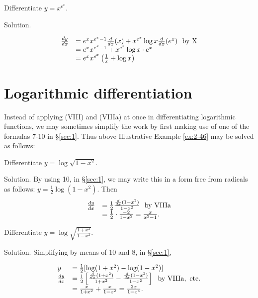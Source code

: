\begin{example}
\label{ex:5-46}
{\rm
Differentiate $y = x^{e^x}$.

Solution.

\[
\begin{array}{ll}
	\frac{dy}{dx} 
&	= e^x x^{e^x - 1} \frac{d}{dx} (x) + x^{e^x} \log x \frac{d}{dx} (e^x)  \ \ {\rm by\ X}\\
&  	= e^x x^{e^x - 1} + x^{e^x} \log x \cdot e^x\\
&  	= e^x x^{e^x} \left ( \frac{1}{x} + \log x \right ) 
\end{array}
\]
}
\end{example}

\section{Logarithmic differentiation}

Instead of applying (VIII) and (VIIIa) at once in differentiating logarithmic 
functions, we may sometimes simplify the work by first making use of one 
of the formulas 7-10 in \S \ref{sec:1}. %
Thus above Illustrative Example \ref{ex:2-46} may be solved as follows:


\begin{example}
{\rm
Differentiate $y = \log \sqrt{1 - x^2}$.

Solution. By using 10, in \S \ref{sec:1}, %
we may write this in a form free from radicals as follows:
$  	y 	= \frac{1}{2} \log (1 - x^2)$.
Then 
\[
\begin{array}{ll}
	\frac{dy}{dx} 	
&= \frac{1}{2} \frac{\frac{d}{dx} (1 - x^2)}{1 - x^2}  \ \ {\rm by\ VIIIa}\\
&  	= \frac{1}{2} \cdot \frac{-2}{1 - x^2} = \frac{x}{x^2 - 1}. 
\end{array}
\]
}
\end{example}

\begin{example}
{\rm
Differentiate $y = \log \sqrt{\frac{1 + x^2}{1 - x^2}}$.

Solution. Simplifying by means of 10 and 8, in \S \ref{sec:1}, %

\[
\begin{array}{ll}
  	y 	&= \frac{1}{2} [ \log (1 + x^2) - \log (1 - x^2) ]\\
\frac{dy}{dx} 	
&= \frac{1}{2} \left [ \frac{\frac{d}{dx} (1 + x^2)}{1 + x^2} 
- \frac{\frac{d}{dx} (1 - x^2)}{1 - x^2} \right ]   \ \ {\rm by\ VIIIa,\ etc.}\\
&  	= \frac{x}{1 + x^2} + \frac{x}{1 - x^2} = \frac{2x}{1 - x^4}. 
\end{array}
\]
}
\end{example}

